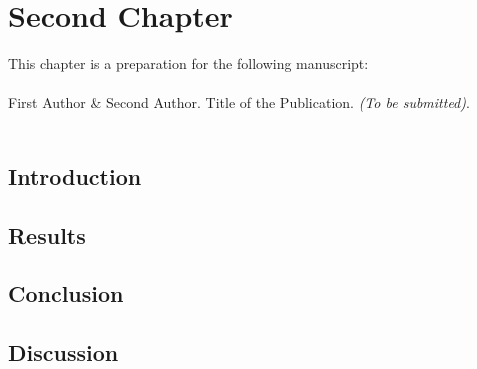 \chapter{Second Chapter}
\label{chapter:second-chapter}

\vspace{3cm}

This chapter is a preparation for the following manuscript:\\
\\
First Author \& 
Second Author. Title of the Publication. \textit{(To be submitted)}.\\
\\

\clearpage

\section{Introduction}
\lipsum[1-10]

\section{Results}
\lipsum[1-10]

\section{Conclusion}
\lipsum[1-10]

\section{Discussion}
\lipsum[1-10]
